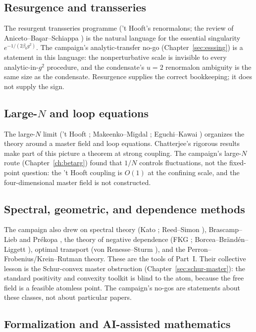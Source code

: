 \subsection{Resurgence and transseries}

The resurgent transseries programme ('t Hooft's renormalons; the review of
Aniceto--Başar--Schiappa \cite{abs}) is the natural language for the essential singularity
$e^{-1/(2\beta_0g^2)}$. The campaign's analytic-transfer no-go (Chapter~\ref{sec:esssing}) is a
statement in this language: the nonperturbative scale is invisible to every analytic-in-$g^2$
procedure, and the condensate's $u=2$ renormalon ambiguity is the same size as the condensate.
Resurgence supplies the correct bookkeeping; it does not supply the sign.

\subsection{Large-$N$ and loop equations}

The large-$N$ limit ('t Hooft \cite{thooft-planar}; Makeenko--Migdal \cite{makeenko-migdal};
Eguchi--Kawai \cite{eguchi-kawai}) organizes the theory around a master field and loop equations.
Chatterjee's rigorous results \cite{chatterjee} make part of this picture a theorem at strong
coupling. The campaign's large-$N$ route (Chapter~\ref{ch:betarg}) found that $1/N$ controls
fluctuations, not the fixed-point question: the 't Hooft coupling is $O(1)$ at the confining
scale, and the four-dimensional master field is not constructed.

\subsection{Spectral, geometric, and dependence methods}

The campaign also drew on spectral theory (Kato \cite{kato}; Reed--Simon \cite{reed-simon}),
Brascamp--Lieb and Pr\'ekopa \cite{bl,prekopa}, the theory of negative dependence
(FKG \cite{fkg}; Borcea--Br\"and\'en--Liggett \cite{bbl}), optimal transport
(von Renesse--Sturm \cite{vrs}), and the Perron--Frobenius/Krein--Rutman theory. These are the
tools of Part~I. Their collective lesson is the Schur-convex master obstruction
(Chapter~\ref{sec:schur-master}): the standard positivity and convexity toolkit is blind to the
atom, because the free field is a feasible atomless point. The campaign's no-gos are statements
about these classes, not about particular papers.

\subsection{Formalization and AI-assisted mathematics}

